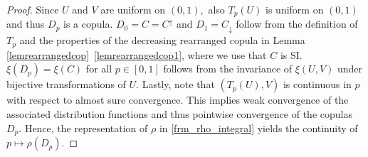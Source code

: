 \documentclass{article}
\theoremstyle{plain}
\theoremstyle{definition}
\begin{document}
\begin{proof}%
    Since \(U\) and \(V\) are uniform on \((0,1),\) also \(T_p(U)\) is uniform on \((0,1)\) and thus \(D_p\) is a copula.
    \(D_0 = C = C^\uparrow\) and \(D_1 = C_\downarrow\) follow from the definition of \(T_p\) and the properties of the decreasing rearranged copula in Lemma \ref{lemrearrangedcop}~\ref{lemrearrangedcop1}, where we use that \(C\) is SI.
    \(\xi(D_p) = \xi(C)\) for all \(p\in [0,1]\) follows from the invariance of \(\xi(U,V)\) under bijective transformations of \(U.\)
    Lastly, note that \((T_p(U),V)\) is continuous in \(p\) with respect to almost sure convergence. This implies weak convergence of the associated distribution functions and thus pointwise convergence of the copulas \(D_p.\) 
    Hence, the representation of \(\rho\) in \eqref{frm_rho_integral} yields the continuity of $p\mapsto \rho(D_p)$.
\end{proof}
\end{document}
